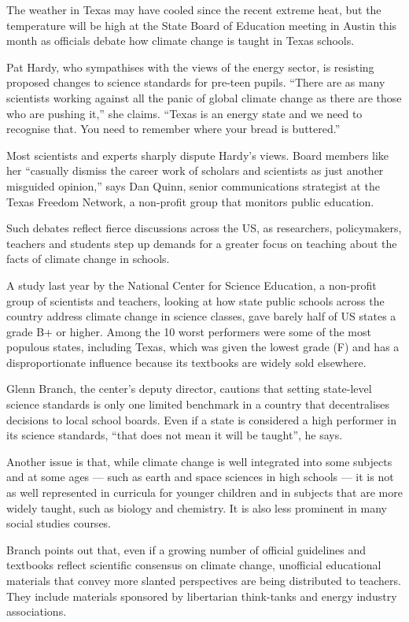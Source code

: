 \documentclass[UTF8,11pt]{ctexart}
\begin{document}
The weather in Texas may have cooled since the recent extreme heat, but the temperature will be high at the State Board of Education meeting in Austin this month as officials debate how climate change is taught in Texas schools.


Pat Hardy, who sympathises with the views of the energy sector, is resisting proposed changes to science standards for pre-teen pupils. “There are as many scientists working against all the panic of global climate change as there are those who are pushing it,” she claims. “Texas is an energy state and we need to recognise that. You need to remember where your bread is buttered.”


Most scientists and experts sharply dispute Hardy’s views. Board members like her “casually dismiss the career work of scholars and scientists as just another misguided opinion,” says Dan Quinn, senior communications strategist at the Texas Freedom Network, a non-profit group that monitors public education.


Such debates reflect fierce discussions across the US, as researchers, policymakers, teachers and students step up demands for a greater focus on teaching about the facts of climate change in schools.


A study last year by the National Center for Science Education, a non-profit group of scientists and teachers, looking at how state public schools across the country address climate change in science classes, gave barely half of US states a grade B+ or higher. Among the 10 worst performers were some of the most populous states, including Texas, which was given the lowest grade (F) and has a disproportionate influence because its textbooks are widely sold elsewhere.


Glenn Branch, the center’s deputy director, cautions that setting state-level science standards is only one limited benchmark in a country that decentralises decisions to local school boards. Even if a state is considered a high performer in its science standards, “that does not mean it will be taught”, he says.


Another issue is that, while climate change is well integrated into some subjects and at some ages — such as earth and space sciences in high schools — it is not as well represented in curricula for younger children and in subjects that are more widely taught, such as biology and chemistry. It is also less prominent in many social studies courses.


Branch points out that, even if a growing number of official guidelines and textbooks reflect scientific consensus on climate change, unofficial educational materials that convey more slanted perspectives are being distributed to teachers. They include materials sponsored by libertarian think-tanks and energy industry associations.
\end{document}
